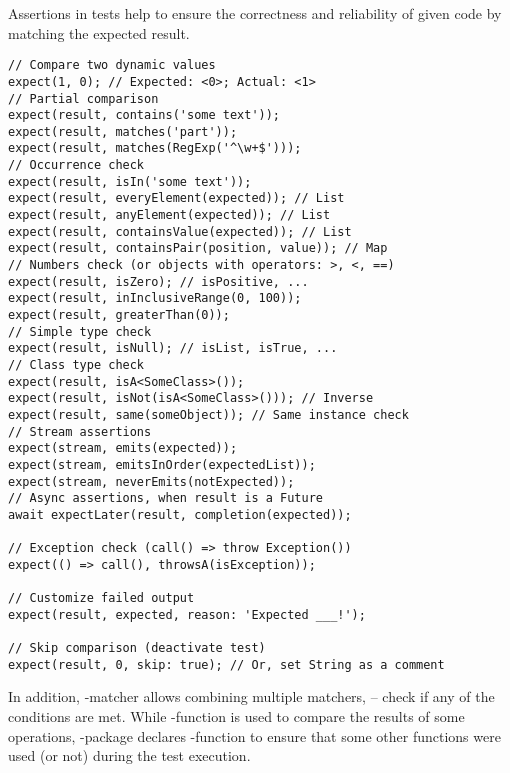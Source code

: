 Assertions in tests help to ensure the correctness and reliability of given code by matching the expected result.

\begin{lstlisting}
// Compare two dynamic values
expect(1, 0); // Expected: <0>; Actual: <1>
// Partial comparison
expect(result, contains('some text'));
expect(result, matches('part'));
expect(result, matches(RegExp('^\w+$')));
// Occurrence check
expect(result, isIn('some text'));
expect(result, everyElement(expected)); // List
expect(result, anyElement(expected)); // List
expect(result, containsValue(expected)); // List
expect(result, containsPair(position, value)); // Map
// Numbers check (or objects with operators: >, <, ==)
expect(result, isZero); // isPositive, ...
expect(result, inInclusiveRange(0, 100));
expect(result, greaterThan(0));
// Simple type check
expect(result, isNull); // isList, isTrue, ...
// Class type check
expect(result, isA<SomeClass>());
expect(result, isNot(isA<SomeClass>())); // Inverse
expect(result, same(someObject)); // Same instance check
// Stream assertions
expect(stream, emits(expected));
expect(stream, emitsInOrder(expectedList));
expect(stream, neverEmits(notExpected));
// Async assertions, when result is a Future
await expectLater(result, completion(expected));

// Exception check (call() => throw Exception())
expect(() => call(), throwsA(isException));

// Customize failed output
expect(result, expected, reason: 'Expected ___!');

// Skip comparison (deactivate test)
expect(result, 0, skip: true); // Or, set String as a comment
\end{lstlisting}

\noindent In addition, -matcher allows combining multiple matchers,  -- check if any of the conditions
are met. While -function is used to compare the results of some operations, -package declares
-function to ensure that some other functions were used (or not) during the test execution.
